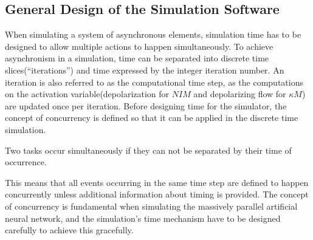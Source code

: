 	\subsection{General Design of the Simulation Software}
		When simulating a system of asynchronous elements, simulation time has to be designed to allow multiple actions to happen simultaneously. %
		To achieve asynchronism in a simulation, time can be separated into discrete time slices(``iterations'') and time expressed by the integer iteration number.
		An iteration is also referred to as the computational time step, as the computations on the activation variable(depolarization for $NIM$ and depolarizing flow for $\kappa M$)
			are updated once per iteration.
		Before designing time for the simulator, the concept of concurrency is defined so that it can be applied in the discrete time simulation.
	
		\begin{mydef}
			Two tasks occur simultaneously if they can not be separated by their time of occurrence. %
		\end{mydef}
		This means that all events occurring in the same time step are defined to happen concurrently unless additional information about timing is provided.
		The concept of concurrency is fundamental when simulating the massively parallel artificial neural network, and the simulation's time mechanism have to be designed carefully to achieve this gracefully.

